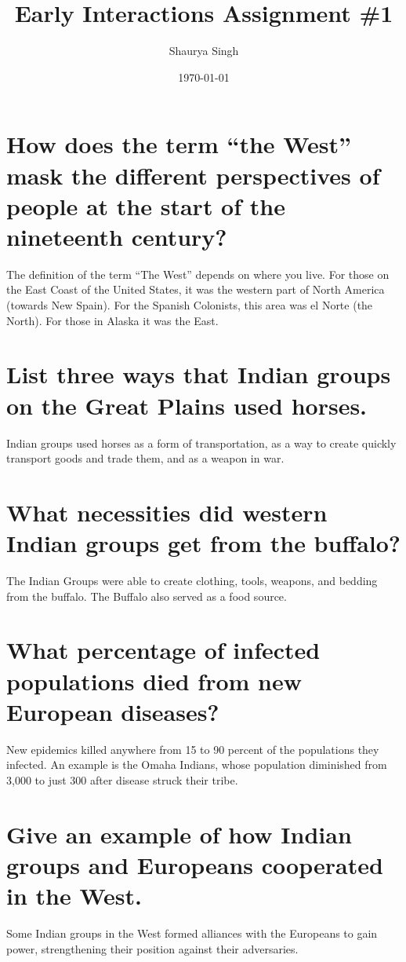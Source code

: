 \documentclass{scrartcl}
\author{Shaurya Singh}
\date{\today}
\title{Early Interactions Assignment \#1}
\begin{document}
\maketitle

\section{How does the term “the West” mask the different perspectives of people at the start of the nineteenth century?}
\label{sec:orga1081ed}
The definition of the term ``The West'' depends on where you live. For those on
the East Coast of the United States, it was the western part of North America
(towards New Spain). For the Spanish Colonists, this area was el Norte (the
North). For those in Alaska it was the East.

\section{List three ways that Indian groups on the Great Plains used horses.}
\label{sec:org1ba22b1}
Indian groups used horses as a form of transportation, as a way to create
quickly transport goods and trade them, and as a weapon in war.

\section{What necessities did western Indian groups get from the buffalo?}
\label{sec:org7593472}
The Indian Groups were able to create clothing, tools, weapons, and bedding from the
buffalo. The Buffalo also served as a food source.

\section{What percentage of infected populations died from new European diseases?}
\label{sec:orgdb2973c}
New epidemics killed anywhere from 15 to 90 percent of the populations they
infected. An example is the Omaha Indians, whose population diminished from
3,000 to just 300 after disease struck their tribe.

\section{Give an example of how Indian groups and Europeans cooperated in the West.}
\label{sec:org6f6e235}
Some Indian groups in the West formed alliances with the Europeans to gain
power, strengthening their position against their adversaries.
\end{document}
